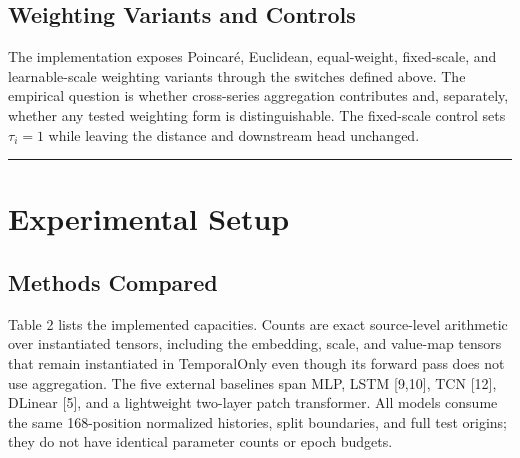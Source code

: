 \documentclass[electronics,article,submit,moreauthors]{Definitions/mdpi}
\begin{document}
\subsection{Weighting Variants and Controls}\label{weighting-variants-and-controls}

The implementation exposes Poincar\'{e}, Euclidean, equal-weight, fixed-scale, and learnable-scale weighting variants through the switches defined above. The empirical question is whether cross-series aggregation contributes and, separately, whether any tested weighting form is distinguishable. The fixed-scale control sets \(\tau_i=1\) while leaving the distance and downstream head unchanged.

\begin{center}\rule{0.5\linewidth}{0.5pt}\end{center}

\section{Experimental Setup}\label{experimental-setup}

\subsection{Methods Compared}\label{methods-compared}

Table 2 lists the implemented capacities. Counts are exact source-level arithmetic over instantiated tensors, including the embedding, scale, and value-map tensors that remain instantiated in TemporalOnly even though its forward pass does not use aggregation. The five external baselines span MLP, LSTM {[}9,10{]}, TCN {[}12{]}, DLinear {[}5{]}, and a lightweight two-layer patch transformer. All models consume the same 168-position normalized histories, split boundaries, and full test origins; they do not have identical parameter counts or epoch budgets.
\end{document}
